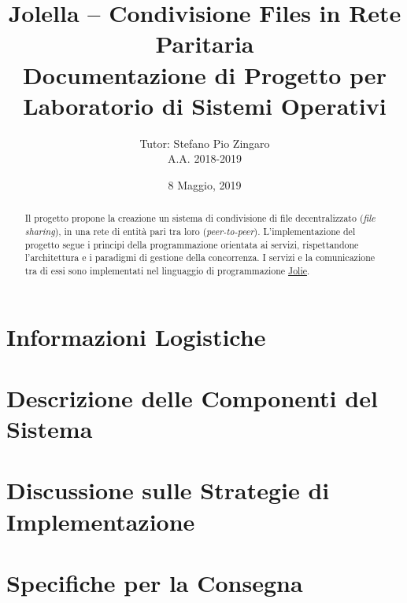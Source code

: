 \documentclass{article}
\title{%
  Jolella -- Condivisione Files in Rete Paritaria\\
  \large Documentazione di Progetto per Laboratorio di Sistemi Operativi}
\author{%
  Tutor: Stefano Pio Zingaro\\
  A.A. 2018-2019}
\date{8 Maggio, 2019}
\begin{document}
\maketitle

\begin{abstract}

 Il progetto propone la creazione un sistema di condivisione di file
 decentralizzato (\textit{file sharing}), in una rete di entità pari tra loro
 (\textit{peer-to-peer}). L'implementazione del progetto segue i principi della
 programmazione orientata ai servizi, rispettandone l'architettura e i paradigmi
 di gestione della concorrenza. I servizi e la comunicazione tra di essi sono
 implementati nel linguaggio di programmazione
 \href{http://jolie-lang.org}{Jolie}.

\end{abstract}

\newpage

\tableofcontents

\newpage

\section{Informazioni Logistiche}
\label{sec:logistic}


\section{Descrizione delle Componenti del Sistema}
\label{sec:components}


\section{Discussione sulle Strategie di Implementazione}
\label{sec:implementation}


\section{Specifiche per la Consegna}
\label{sec:delivery}




\end{document}
